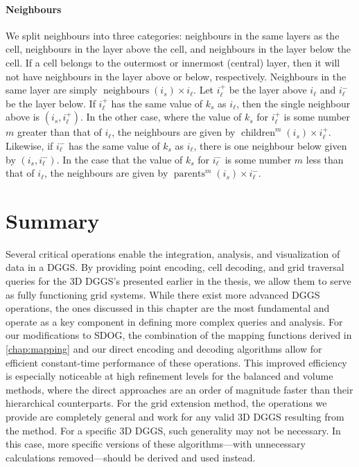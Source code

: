 \paragraph{Neighbours}
We split neighbours into three categories: neighbours in the same layers as the cell, neighbours in the layer above the cell, and neighbours in the layer below the cell.
If a cell belongs to the outermost or innermost (central) layer, then it will not have neighbours in the layer above or below, respectively.
Neighbours in the same layer are simply $\operatorname{neighbours}(i_s) \times i_\ell$.
Let $i_\ell^+$ be the layer above $i_\ell$ and $i_\ell^-$ be the layer below.
If $i_\ell^+$ has the same value of $k_s$ as $i_\ell$, then the single neighbour above is $(i_s, i_\ell^+)$.
In the other case, where the value of $k_s$ for $i_\ell^+$ is some number $m$ greater than that of $i_\ell$, the neighbours are given by $\operatorname{children}^m(i_s) \times i_\ell^+$.
Likewise, if $i_\ell^-$ has the same value of $k_s$ as $i_\ell$, there is one neighbour below given by $(i_s, i_\ell^-)$.
In the case that the value of $k_s$ for $i_\ell^-$ is some number $m$ less than that of $i_\ell$, the neighbours are given by $\operatorname{parents}^m(i_s) \times i_\ell^-$.


\section{Summary}
Several critical operations enable the integration, analysis, and visualization of data in a DGGS.
By providing point encoding, cell decoding, and grid traversal queries for the 3D DGGS's presented earlier in the thesis, we allow them to serve as fully functioning grid systems.
While there exist more advanced DGGS operations, the ones discussed in this chapter are the most fundamental and operate as a key component in defining more complex queries and analysis.
For our modifications to SDOG, the combination of the mapping functions derived in \cref{chap:mapping} and our direct encoding and decoding algorithms allow for efficient constant-time performance of these operations.
This improved efficiency is especially noticeable at high refinement levels for the balanced and volume methods, where the direct approaches are an order of magnitude faster than their hierarchical counterparts.
For the grid extension method, the operations we provide are completely general and work for any valid 3D DGGS resulting from the method.
For a specific 3D DGGS, such generality may not be necessary.
In this case, more specific versions of these algorithms---with unnecessary calculations removed---should be derived and used instead.
